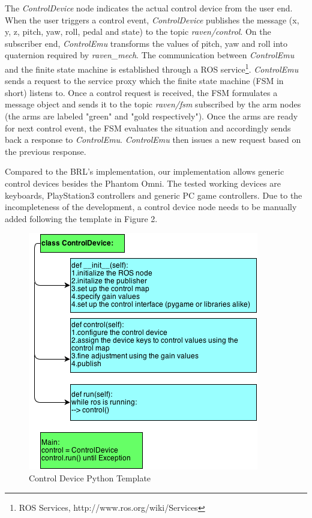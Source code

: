 \documentclass[letterpaper,twocolumn,10pt]{article}
\begin{document}
The {\it ControlDevice} node indicates the actual control device from
the user end. When the user triggers a control event, {\it
  ControlDevice} publishes the message (x, y, z, pitch, yaw, roll,
pedal and state) to the topic {\it raven/control}. On the subscriber
end, {\it ControlEmu} transforms the values of pitch, yaw and roll
into quaternion required by {\it raven\_mech}. The communication
between {\it ControlEmu} and the finite state machine is established
through a ROS service\footnote{ROS Services,
  http://www.ros.org/wiki/Services}. {\it ControlEmu} sends a request
to the service proxy which the finite state machine (FSM in short)
listens to. Once a control request is received, the FSM formulates a
message object and sends it to the topic {\it raven/fsm} subscribed by
the arm nodes (the arms are labeled "green" and "gold
respectively"). Once the arms are ready for next control event, the
FSM evaluates the situation and accordingly sends back a response to
{\it ControlEmu}. {\it ControlEmu} then issues a new request based on
the previous response.

Compared to the BRL's implementation, our implementation allows
generic control devices besides the Phantom Omni. The tested working
devices are keyboards, PlayStation3 controllers and generic PC game
controllers. Due to the incompleteness of the development, a control
device node needs to be manually added following the template in
Figure 2.

\begin{figure}[h]
\includegraphics[scale=0.6]{ControlDeviceTemplate.png}
\caption{Control Device Python Template}
\end{figure}
\end{document}
